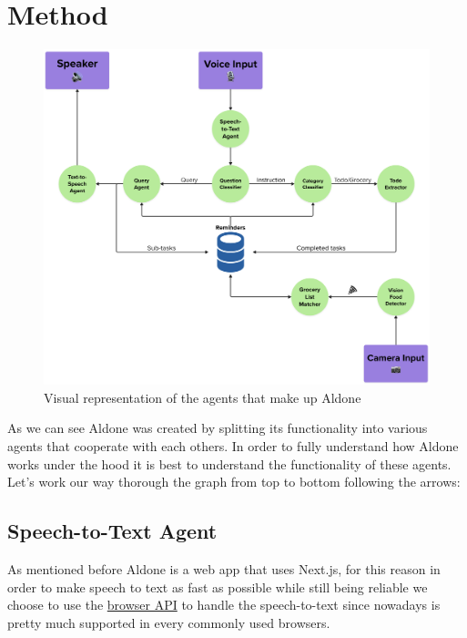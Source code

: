 \documentclass{article}
\begin{document}
\section*{\color{draculagreen}Method} 
\begin{figure}[htbp]
\centering
\includegraphics[width=\textwidth]{diagram.png}
\caption{\small Visual representation of the agents that make up Aldone}
\end{figure}

As we can see Aldone was created by splitting its functionality into various agents that cooperate with each others. In order to fully understand how Aldone works under the hood it is best to understand the functionality of these agents. Let's work our way thorough the graph from top to bottom following the arrows:

\subsection*{\color{draculayellow}Speech-to-Text Agent}
As mentioned before Aldone is a web app that uses Next.js, for this reason in order to make speech to text as fast as possible while still being reliable we choose to use the \href{https://developer.chrome.com/blog/voice-driven-web-apps-introduction-to-the-web-speech-api}{browser API} to handle the speech-to-text since nowadays is pretty much supported in every commonly used browsers.
\end{document}
